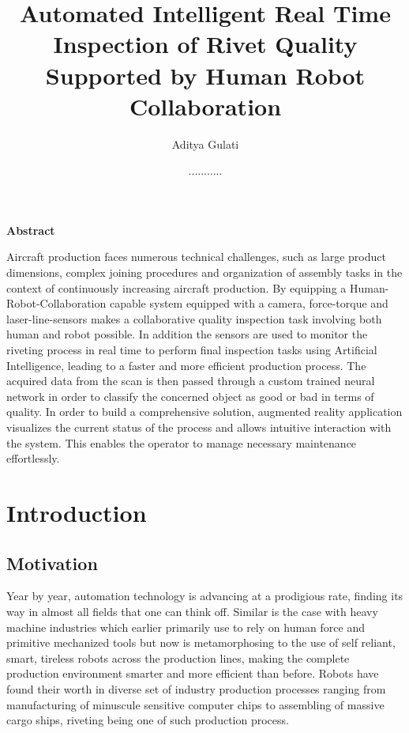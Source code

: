 \documentclass{article}
\title {Automated Intelligent Real Time Inspection of Rivet Quality Supported by Human Robot Collaboration
}
\author{ Aditya Gulati }
\date{...........}
\begin{document}
\maketitle

\newpage

\tableofcontents

\newpage
\listoffigures
\newpage

{\Large\bfseries\noindent Abstract}


\noindent
Aircraft production faces numerous technical challenges, such as large product dimensions, complex joining procedures and organization of assembly tasks in the context of continuously increasing aircraft production. By equipping a Human-Robot-Collaboration capable system equipped with a camera, force-torque and laser-line-sensors makes a collaborative quality inspection task involving both human and robot possible. In addition the sensors are used to monitor the riveting process in real time to perform final inspection tasks using Artificial Intelligence, leading to a faster and more efficient production process. The acquired data from the scan is then passed through a custom trained neural network in order to classify the concerned object as good or bad in terms of quality. In order to build a comprehensive solution, augmented reality application visualizes the current status of the process and allows intuitive interaction with the system. This enables the operator to manage necessary maintenance effortlessly.

\newpage




\section{Introduction}





\subsection{Motivation}


\par Year by year, automation technology is advancing at a prodigious rate, finding its way in almost all fields that one can think off. Similar is the case with heavy machine industries which earlier primarily use to rely on human force and primitive mechanized tools but now is metamorphosing to the use of self reliant, smart, tireless robots across the production lines,  making the complete production environment smarter and more efficient than before. Robots have found their worth in diverse set of industry production processes ranging from manufacturing of minuscule sensitive computer chips to assembling of massive cargo ships, riveting being one of such production process.\\
\end{document}
